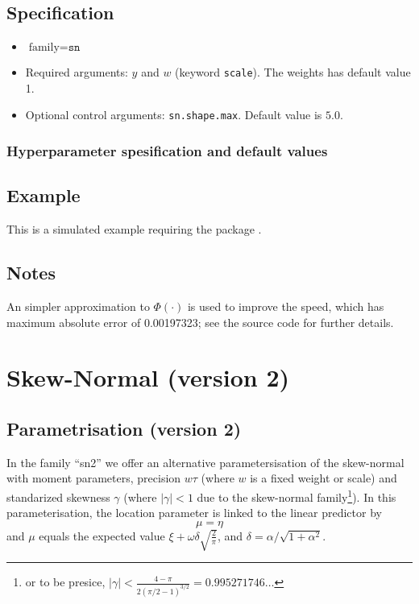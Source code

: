 \documentclass[a4paper,11pt]{article}
\begin{document}
\subsection*{Specification}

\begin{itemize}
\item $\text{family}=\texttt{sn}$
\item Required arguments: $y$ and $w$ (keyword \texttt{scale}). The
    weights has default value 1.
\item Optional control arguments: \texttt{sn.shape.max}. Default value is
    $5.0$.
\end{itemize}

\subsubsection*{Hyperparameter spesification and default values}




\subsection*{Example}

This is a simulated example requiring the package \verb@sn@.


\subsection*{Notes}

An simpler approximation to $\Phi(\cdot)$ is used to improve the
speed, which has maximum absolute error of 0.00197323; see the source
code for further details.

\clearpage


\section*{Skew-Normal (version 2)}

\subsection*{Parametrisation (version 2)}

In the family ``sn2'' we offer an alternative parametersisation of the
skew-normal with moment parameters, precision $w\tau$
(where $w$ is a fixed weight or scale) and standarized skewness
$\gamma$ (where $|\gamma|<1$
due to the skew-normal family\footnote{%
    or to be presice,
    $|\gamma| < \frac{4-\pi}{2\left(\pi/2-1\right)^{3/2}} =
    0.995271746\ldots$}). In this parameterisation, the location
parameter is linked to the linear predictor by
\begin{displaymath}
    \mu = \eta
\end{displaymath}
and $\mu$ equals the expected value $\xi + \omega \delta
\sqrt{\frac{2}{\pi}}$, and $\delta = \alpha/\sqrt{1+\alpha^{2}}$.
\end{document}
